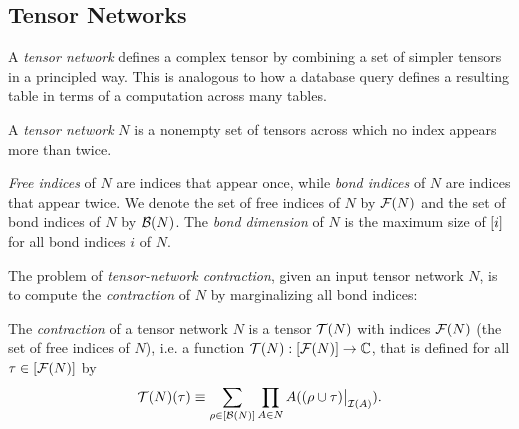 
\subsection{Tensor Networks}
\label{sec:tensors:tensors:tensor-networks}
A \emph{tensor network} defines a complex tensor by combining a set of simpler tensors in a principled way. This is analogous to how a database query defines a resulting table in terms of a computation across many tables.

\begin{definition}
	\label{def:tensor-contraction-network}
	A \emph{tensor network} $N$ is a nonempty set of tensors across which no index appears more than twice.
\end{definition}

\emph{Free indices} of $N$ are indices that appear once, while \emph{bond indices} of $N$ are indices that appear twice. We denote the set of free indices of $N$ by $\mathcal{F}(N)$ and the set of bond indices of $N$ by $\mathcal{B}(N)$. The \emph{bond dimension} of $N$ is the maximum size of $[i]$ for all bond indices $i$ of $N$.

The problem of \emph{tensor-network contraction}, given an input tensor network $N$, is to compute the \emph{contraction} of $N$ by marginalizing all bond indices:
\begin{definition}\label{def:contraction}
The \emph{contraction} of a tensor network $N$ is a tensor $\mathcal{T}(N)$ with indices $\mathcal{F}(N)$ (the set of free indices of $N$), i.e. a function $\mathcal{T}(N) : [\mathcal{F}(N)] \rightarrow \mathbb{C}$, that is defined for all $\tau \in [\mathcal{F}(N)]$ by
		\begin{equation}
        \label{eqn:contraction} 
        \mathcal{T}(N)(\tau) \equiv \sum_{\rho \in [\mathcal{B}(N)]} \prod_{A \in N} A((\rho \cup \tau)\big|_{\mathcal{I}(A)}).
        \end{equation}
\end{definition}

